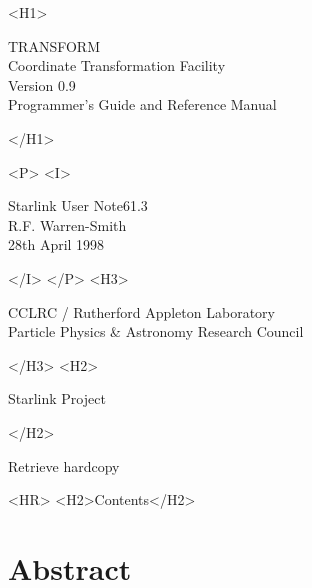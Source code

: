 \documentclass[twoside,11pt]{article}
\newcommand{\stardoccategory}  {Starlink User Note}
\newcommand{\stardocsource}    {sun\stardocnumber}
\newcommand{\stardocnumber}    {61.3}
\newcommand{\stardocauthors}   {R.F. Warren-Smith}
\newcommand{\stardocdate}      {28th April 1998}
\newcommand{\stardoctitle}     {TRANSFORM \\[2.5ex]
                                Coordinate Transformation Facility}
\newcommand{\stardocversion}   {Version 0.9}
\newcommand{\stardocmanual}    {Programmer's Guide and Reference Manual}
\newcommand{\htmladdnormallink}[2]{#1}
\newcommand{\htmladdimg}[1]{}
\newcommand{\htmlref}[2]{#1}
\newcommand{\htmladdtonavigation}[1]{}
\newcommand{\xlabel}[1]{}
\newcommand{\latexonlytoc}[0]{\tableofcontents}
\begin{document}
\begin{htmlonly}
   \xlabel{}
   \begin{rawhtml} <H1> \end{rawhtml}
      \stardoctitle\\
      \stardocversion\\
      \stardocmanual
   \begin{rawhtml} </H1> \end{rawhtml}


   \begin{rawhtml} <P> <I> \end{rawhtml}
   \stardoccategory \stardocnumber \\
   \stardocauthors \\
   \stardocdate
   \begin{rawhtml} </I> </P> <H3> \end{rawhtml}
      \htmladdnormallink{CCLRC}{http://www.cclrc.ac.uk} /
      \htmladdnormallink{Rutherford Appleton Laboratory}
                        {http://www.cclrc.ac.uk/ral} \\
      \htmladdnormallink{Particle Physics \& Astronomy Research Council}
                        {http://www.pparc.ac.uk} \\
   \begin{rawhtml} </H3> <H2> \end{rawhtml}
      \htmladdnormallink{Starlink Project}{http://star-www.rl.ac.uk/}
   \begin{rawhtml} </H2> \end{rawhtml}
   \htmladdnormallink{\htmladdimg{source.gif} Retrieve hardcopy}
      {http://star-www.rl.ac.uk/cgi-bin/hcserver?\stardocsource}\\

  \label{stardoccontents}
  \begin{rawhtml} 
    <HR>
    <H2>Contents</H2>
  \end{rawhtml}
  \renewcommand{\latexonlytoc}[0]{}
  \htmladdtonavigation{\htmlref{\htmladdimg{contents_motif.gif}}
        {stardoccontents}}

  \section{\xlabel{abstract}Abstract}
\end{htmlonly}
\end{document}

